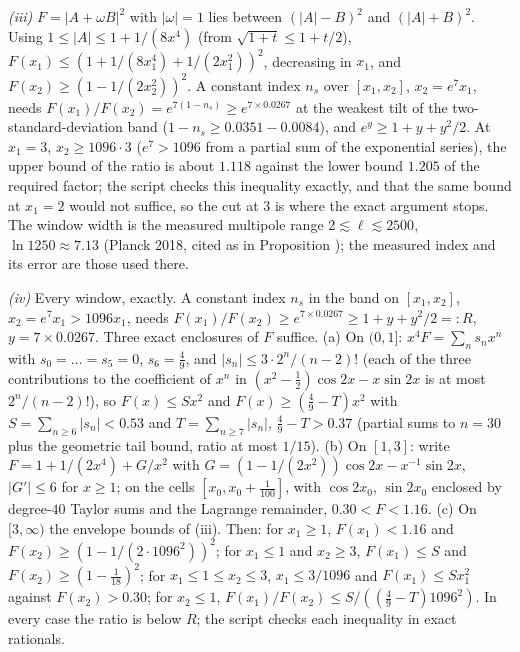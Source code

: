 \emph{(iii)} $F = |A + \omega B|^{2}$ with $|\omega| = 1$ lies between $(|A| - B)^{2}$ and $(|A| + B)^{2}$. Using $1 \le |A| \le 1 + 1/(8x^{4})$ (from $\sqrt{1 + t} \le 1 + t/2$), $F(x_1) \le (1 + 1/(8x_1^{4}) + 1/(2x_1^{2}))^{2}$, decreasing in $x_1$, and $F(x_2) \ge (1 - 1/(2x_2^{2}))^{2}$. A constant index $n_s$ over $[x_1, x_2]$, $x_2 = e^{7}x_1$, needs $F(x_1)/F(x_2) = e^{7(1 - n_s)} \ge e^{7 \times 0.0267}$ at the weakest tilt of the two-standard-deviation band ($1 - n_s \ge 0.0351 - 0.0084$), and $e^{y} \ge 1 + y + y^{2}/2$. At $x_1 = 3$, $x_2 \ge 1096 \cdot 3$ ($e^{7} > 1096$ from a partial sum of the exponential series), the upper bound of the ratio is about $1.118$ against the lower bound $1.205$ of the required factor; the script checks this inequality exactly, and that the same bound at $x_1 = 2$ would not suffice, so the cut at $3$ is where the exact argument stops. The window width is the measured multipole range $2 \lesssim \ell \lesssim 2500$, $\ln 1250 \approx 7.13$ (Planck 2018, cited as in Proposition ); the measured index and its error are those used there.

\emph{(iv)} Every window, exactly. A constant index $n_s$ in the band on $[x_1, x_2]$, $x_2 = e^{7}x_1 > 1096x_1$, needs $F(x_1)/F(x_2) \ge e^{7 \times 0.0267} \ge 1 + y + y^{2}/2 =: R$, $y = 7 \times 0.0267$. Three exact enclosures of $F$ suffice. (a) On $(0, 1]$: $x^{4}F = \sum_n s_nx^{n}$ with $s_0 = \dots = s_5 = 0$, $s_6 = \tfrac49$, and $|s_n| \le 3 \cdot 2^{n}/(n-2)!$ (each of the three contributions to the coefficient of $x^{n}$ in $(x^{2} - \tfrac12)\cos 2x - x\sin 2x$ is at most $2^{n}/(n-2)!$), so $F(x) \le Sx^{2}$ and $F(x) \ge (\tfrac49 - T)x^{2}$ with $S = \sum_{n \ge 6}|s_n| < 0.53$ and $T = \sum_{n \ge 7}|s_n|$, $\tfrac49 - T > 0.37$ (partial sums to $n = 30$ plus the geometric tail bound, ratio at most $1/15$). (b) On $[1, 3]$: write $F = 1 + 1/(2x^{4}) + G/x^{2}$ with $G = (1 - 1/(2x^{2}))\cos 2x - x^{-1}\sin 2x$, $|G'| \le 6$ for $x \ge 1$; on the cells $[x_0, x_0 + \tfrac1{100}]$, with $\cos 2x_0$, $\sin 2x_0$ enclosed by degree-$40$ Taylor sums and the Lagrange remainder, $0.30 < F < 1.16$. (c) On $[3, \infty)$ the envelope bounds of (iii). Then: for $x_1 \ge 1$, $F(x_1) < 1.16$ and $F(x_2) \ge (1 - 1/(2 \cdot 1096^{2}))^{2}$; for $x_1 \le 1$ and $x_2 \ge 3$, $F(x_1) \le S$ and $F(x_2) \ge (1 - \tfrac1{18})^{2}$; for $x_1 \le 1 \le x_2 \le 3$, $x_1 \le 3/1096$ and $F(x_1) \le Sx_1^{2}$ against $F(x_2) > 0.30$; for $x_2 \le 1$, $F(x_1)/F(x_2) \le S/((\tfrac49 - T)1096^{2})$. In every case the ratio is below $R$; the script checks each inequality in exact rationals.

